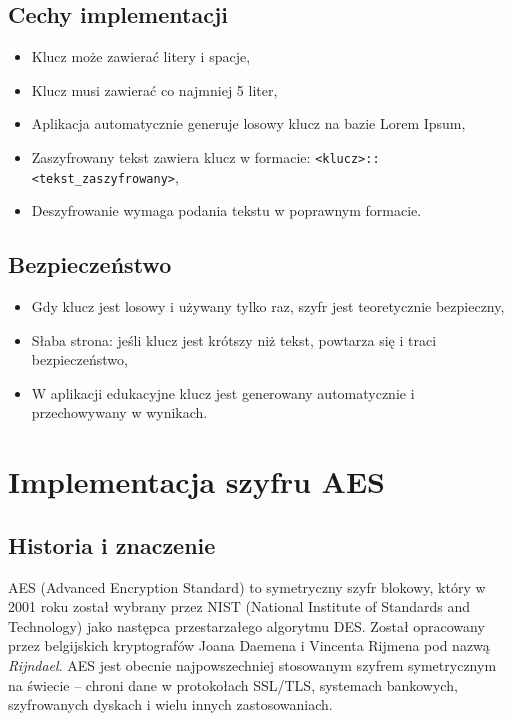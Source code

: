 \documentclass[12pt,a4paper]{article}
\begin{document}
\subsection{Cechy implementacji}
\begin{itemize}
    \item Klucz może zawierać litery i spacje,
    \item Klucz musi zawierać co najmniej 5 liter,
    \item Aplikacja automatycznie generuje losowy klucz na bazie Lorem Ipsum,
    \item Zaszyfrowany tekst zawiera klucz w formacie: \texttt{<klucz>::<tekst\_zaszyfrowany>},
    \item Deszyfrowanie wymaga podania tekstu w poprawnym formacie.
\end{itemize}

\subsection{Bezpieczeństwo}
\begin{itemize}
    \item Gdy klucz jest losowy i używany tylko raz, szyfr jest teoretycznie bezpieczny,
    \item Słaba strona: jeśli klucz jest krótszy niż tekst, powtarza się i traci bezpieczeństwo,
    \item W aplikacji edukacyjne klucz jest generowany automatycznie i przechowywany w wynikach.
\end{itemize}

\newpage
\section{Implementacja szyfru AES}

\subsection{Historia i znaczenie}
AES (Advanced Encryption Standard) to symetryczny szyfr blokowy, który w 2001 roku został wybrany przez NIST (National Institute of Standards and Technology) jako następca przestarzałego algorytmu DES. 
Został opracowany przez belgijskich kryptografów Joana Daemena i Vincenta Rijmena pod nazwą \textit{Rijndael}. 
AES jest obecnie najpowszechniej stosowanym szyfrem symetrycznym na świecie -- chroni dane w protokołach SSL/TLS, systemach bankowych, szyfrowanych dyskach i wielu innych zastosowaniach.
\end{document}
